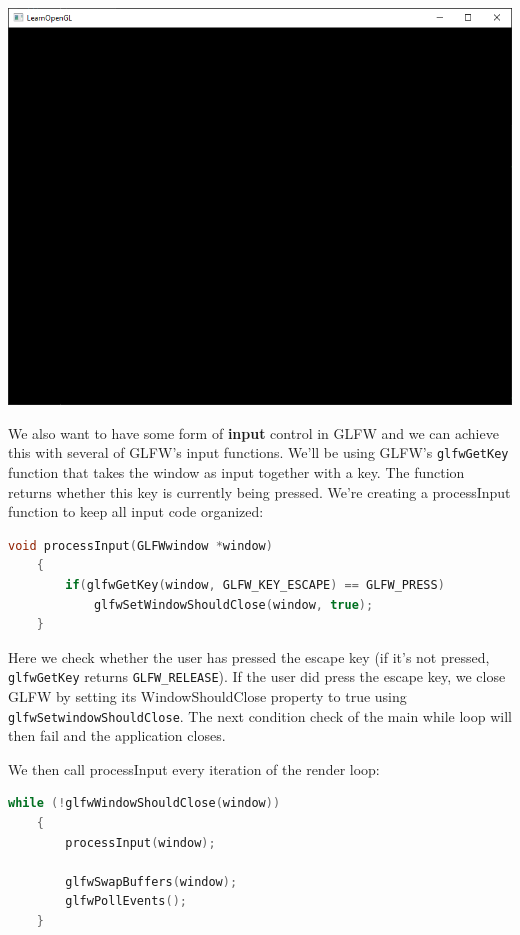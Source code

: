 \begin{center}
    \includegraphics[scale=0.4]{pics/hellowindow.png}
\end{center}

We also want to have some form of \textbf{input} control in GLFW and we can achieve this with several of GLFW's input functions. We'll be using GLFW's \verb|glfwGetKey| function that takes the window as input together with a key. The function returns whether this key is currently being pressed. We're creating a processInput function to keep all input code organized:

\begin{lstlisting}[language=C++]
    void processInput(GLFWwindow *window)
    {
        if(glfwGetKey(window, GLFW_KEY_ESCAPE) == GLFW_PRESS)
            glfwSetWindowShouldClose(window, true);
    }
\end{lstlisting}

Here we check whether the user has pressed the escape key (if it's not pressed, \verb|glfwGetKey| returns \verb|GLFW_RELEASE|). If the user did press the escape key, we close GLFW by setting its WindowShouldClose property to true using \verb|glfwSetwindowShouldClose|. The next condition check of the main while loop will then fail and the application closes.

We then call processInput every iteration of the render loop:

\begin{lstlisting}[language=C++]
    while (!glfwWindowShouldClose(window))
    {
        processInput(window);

        glfwSwapBuffers(window);
        glfwPollEvents();
    }  
\end{lstlisting}

